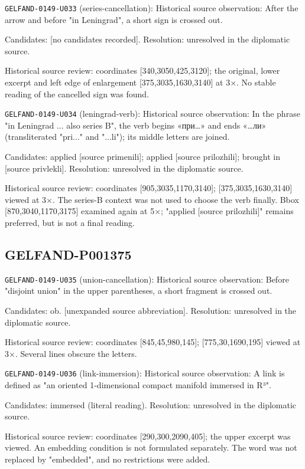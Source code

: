 \noindent\texttt{GELFAND-0149-U033} (series-cancellation): Historical source observation: After the arrow and before "in Leningrad", a short sign is crossed out.\par
Candidates: [no candidates recorded]. Resolution: unresolved in the diplomatic source.\par
Historical source review: coordinates [340,3050,425,3120]; the original, lower excerpt and left edge of enlargement [375,3035,1630,3140] at 3×. No stable reading of the cancelled sign was found.\par

\noindent\texttt{GELFAND-0149-U034} (leningrad-verb): Historical source observation: In the phrase "in Leningrad ... also series B", the verb begins «при…» and ends «…ли» (transliterated "pri..." and "...li"); its middle letters are joined.\par
Candidates: applied [source primenili]; applied [source prilozhili]; brought in [source privlekli]. Resolution: unresolved in the diplomatic source.\par
Historical source review: coordinates [905,3035,1170,3140]; [375,3035,1630,3140] viewed at 3×. The series-B context was not used to choose the verb finally. Bbox [870,3040,1170,3175] examined again at 5×; "applied [source prilozhili]" remains preferred, but is not a final reading.\par

\subsection*{GELFAND-P001375}
\noindent\texttt{GELFAND-0149-U035} (union-cancellation): Historical source observation: Before "disjoint union" in the upper parentheses, a short fragment is crossed out.\par
Candidates: ob. [unexpanded source abbreviation]. Resolution: unresolved in the diplomatic source.\par
Historical source review: coordinates [845,45,980,145]; [775,30,1690,195] viewed at 3×. Several lines obscure the letters.\par

\noindent\texttt{GELFAND-0149-U036} (link-immersion): Historical source observation: A link is defined as "an oriented 1-dimensional compact manifold immersed in R³".\par
Candidates: immersed (literal reading). Resolution: unresolved in the diplomatic source.\par
Historical source review: coordinates [290,300,2090,405]; the upper excerpt was viewed. An embedding condition is not formulated separately. The word was not replaced by "embedded", and no restrictions were added.\par

